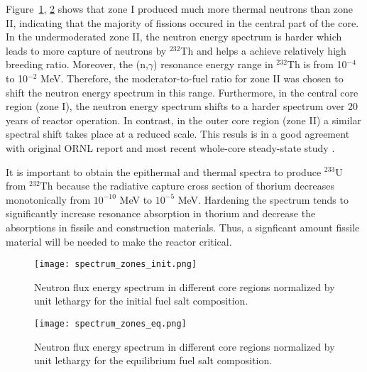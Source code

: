 Figure~\ref{fig:spectrum_zones_init}, \ref{fig:spectrum_zones_eq} shows that zone I produced much more thermal neutrons than zone II, indicating that the majority of fissions occured in the central part of the core. In the undermoderated zone II, the neutron energy spectrum is harder which leads to more capture of neutrons by $^{232}$Th and helps a achieve relatively high breeding ratio. Moreover, the (n,$\gamma$) resonance energy range in $^{232}$Th is from 10$^{-4}$ to 10$^{-2}$ MeV. Therefore, the moderator-to-fuel ratio for zone II was chosen to shift the neutron energy spectrum in this range. Furthermore, in the central core region (zone I), the neutron energy spectrum shifts to a harder spectrum over 20 years of reactor operation. In contrast, in the outer core region (zone II) a similar spectral shift takes place at a reduced scale. This resuls is in a good agreement with original ORNL report \cite{robertson_conceptual_1971} and most recent whole-core steady-state study \cite{park_whole_2015}.

It is important to obtain the epithermal and thermal spectra to produce $^{233}$U from $^{232}$Th because the radiative capture cross section of thorium decreases monotonically from $10^{-10}$ MeV to $10^{-5}$ MeV. Hardening the spectrum tends to significantly increase resonance absorption in thorium and decrease the absorptions in fissile and construction materials. Thus, a signficant amount fissile material will be needed to make the reactor critical. 

\begin{figure}[htp!] %
  \centering
    \vspace{-0.3em}
  \texttt{[image: spectrum\_zones\_init.png]} 
      \vspace{-0.3em}
  \caption{Neutron flux energy spectrum in different core regions normalized by unit lethargy for the initial fuel salt composition.}
    \vspace{-1.6em}
  \label{fig:spectrum_zones_init}
\end{figure}
\begin{figure}[htp!] %
  \centering
    \vspace{-0.3em}
  \texttt{[image: spectrum\_zones\_eq.png]} 
      \vspace{-0.3em}
  \caption{Neutron flux energy spectrum in different core regions normalized by unit lethargy for the equilibrium fuel salt composition.}
    \vspace{-1.0em}
  \label{fig:spectrum_zones_eq}
\end{figure}
\FloatBarrier

